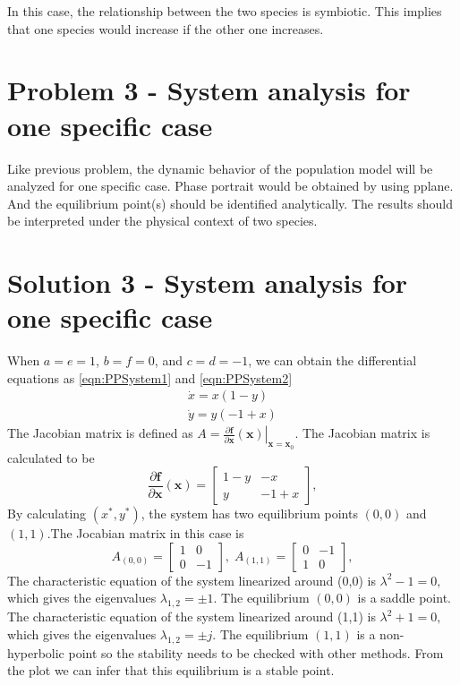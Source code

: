 \documentclass[a4paper,twocolumn]{article} %
\begin{document}
In this case, the relationship between the two species is symbiotic. This implies that one species would increase if the other one increases. 

\section*{Problem 3 - System analysis for one specific case}
\label{sec:prob3} 
Like previous problem, the dynamic behavior of the population model will be analyzed for one specific case. Phase portrait would be obtained by using pplane. And the equilibrium point(s) should be identified analytically. The results should be interpreted under the physical context of two species. 


\section*{Solution 3 - System analysis for one specific case}
\label{sec:solu3}
When 
$a=e=1$, $b=f=0$, and $c=d=-1$,
  we can obtain the differential equations as \eqref{eqn:PPSystem1} and \eqref{eqn:PPSystem2} 
\begin{subequations}\label{eqn:PPSystem}
\begin{align}
    \dot{x} = x(1-y) \label{eqn:PPSystem1} \\
    \dot{y} = y(-1+x) \label{eqn:PPSystem2}
\end{align}
\end{subequations}
The Jacobian matrix is defined as $A = \left. \frac{\partial\textbf{f}}{\partial \textbf{x}}(\textbf{x}) \right|_{\textbf{x}=\textbf{x}_0}$. The Jacobian matrix is calculated to be
\begin{equation*}
    \frac{\partial\textbf{f}}{\partial \textbf{x}}(\textbf{x}) =
    \left[\begin{array}{cc}
    1-y & -x \\
    y & -1+x
    \end{array}\right],
\end{equation*}
By calculating $(x^*,y^*)$, the system has two equilibrium points $(0,0)$ and $(1,1)$.The Jocabian matrix in this case is
\begin{equation*}
    A_{(0,0)} =
    \left[\begin{array}{cc}
    1 & 0 \\
    0 & -1
    \end{array}\right], \; A_{(1,1)} =
    \left[\begin{array}{cc}
    0 & -1 \\
    1 & 0
    \end{array}\right],   
    \end{equation*}
 The characteristic equation of the system linearized around \mbox{(0,0)} is
$\lambda^2 -1 = 0,$ which gives the eigenvalues $\lambda_{1,2} = \pm 1$. The equilibrium $(0,0)$ is a saddle point. 
The characteristic equation of the system linearized around \mbox{(1,1)} is
$\lambda^2 +1 = 0,$ which gives the eigenvalues $\lambda_{1,2} = \pm j$. The equilibrium $(1,1)$ is a non-hyperbolic point so the stability needs to be checked with other methods. From the plot we can infer that this equilibrium is a stable point.  
\end{document}
